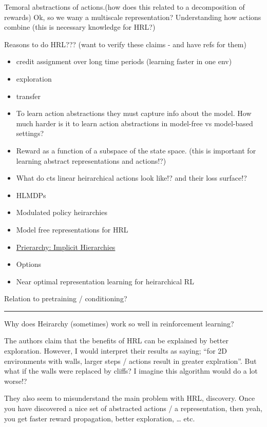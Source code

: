 Temoral abstractions of actions.(how does this related to a
decomposition of rewards) Ok, so we wany a multiscale representation?
Understanding how actions combine (this is necessary knowledge for HRL?)

Reasons to do HRL??? (want to verify these claims - and have refs for
them)

\begin{itemize}
\item
  credit assignment over long time periods (learning faster in one env)
\item
  exploration
\item
  transfer
\item
  To learn action abstractions they must capture info about the model.
  How much harder is it to learn action abstractions in model-free vs
  model-based settings?
\item
  Reward as a function of a subspace of the state space. (this is
  important for learning abstract representations and actions!?)
\item
  What do cts linear heirarchical actions look like!? and their loss
  surface!?
\item
  HLMDPs \cite{Saxea}
\item
  Modulated policy heirarchies \cite{Pashevich}
\item
  Model free representations for HRL \cite{Rafati}
\item
  \href{https://blog.aqnichol.com/2019/04/03/prierarchy-implicit-hierarchies/}{Prierarchy:
  Implicit Hierarchies}
\item
  Options
\item
  Near optimal representation learning for heirarchical RL \cite{Nachum2018}
\end{itemize}

Relation to pretraining / conditioning?

\begin{center}\rule{0.5\linewidth}{\linethickness}\end{center}

Why does Heirarchy (sometimes) work so well in reinforcement learning?

The authors claim that the benefits of HRL can be explained by better
exploration. However, I would interpret their results as saying; ``for
2D environments with walls, larger steps / actions result in greater
explration''. But what if the walls were replaced by cliffs? I imagine
this algorithm would do a lot worse!?

They also seem to misunderstand the main problem with HRL, discovery.
Once you have discovered a nice set of abstracted actions / a
representation, then yeah, you get faster reward propagation, better
exploration, \ldots{} etc.
